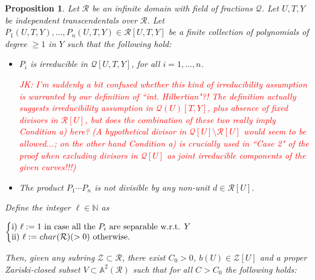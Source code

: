 \documentclass[11pt,a4paper,reqno]{amsart}
\newtheorem{prop}[thm]{Proposition}
\theoremstyle{definition}
\begin{document}
\begin{prop}
\label{prop:zu_inthilb_aux}
Let $\mathcal R$ be an infinite domain with field of fractions $\mathcal Q$. Let $U,T,Y$ be independent transcendentals over $\mathcal R$. %
Let $P_1(U,T,Y),\dots, P_n(U,T,Y)\in \mathcal R[U,T,Y]$ be a finite collection of polynomials of degree $\ge 1$ in $Y$ such that the following hold:
\begin{itemize}
\item[a)] $P_i$ is irreducible in $\mathcal Q[U,T,Y]$, for all $i=1,\dots, n$.

\textcolor{red}{JK: I'm suddenly a bit confused whether this kind of irreducibility assumption is warranted by our definition of ``int. Hilbertian"?! The definition actually suggests irreducibility assumption in $\mathcal Q(U)[T,Y]$, plus absence of fixed divisors in $\mathcal{R}[U]$, but does the combination of these two really imply Condition a) here? (A hypothetical divisor in $\mathcal{Q}[U]\setminus \mathcal{R}[U]$ would seem to be allowed...; on the other hand Condition a) is crucially used in ``Case 2" of the proof when excluding divisors in $\mathcal{Q}[U]$ as joint irreducible components of the given curves!!!)}
\item[b)] The product $P_1\cdots P_n$ is not divisible by any non-unit $d\in \mathcal R[U]$. 
%
\end{itemize}
%
Define the integer $\ell\in \mathbb{N}$ as 
\vskip 1mm
\centerline{$\left\{\begin{matrix}
\hbox{{\rm i)} $\ell:=1$ in case all the $P_i$ are separable  w.r.t. $Y$} \hfill \\
\hbox{{\rm ii)} $\ell:=char(\mathcal R) (>0)$ otherwise.} \hfill \\
\end{matrix}\right.
$}
\vskip 1mm

\noindent
Then, given any subring $\mathcal Z\subset \mathcal R$, 
there exist $C_0>0$, $b(U)\in \mathcal Z[U]$
and a proper Zariski-closed subset $V\subset \mathbb{A}^2(\mathcal R)$ such that for all $C>C_0$ the following holds:


\end{prop}
\end{document}

